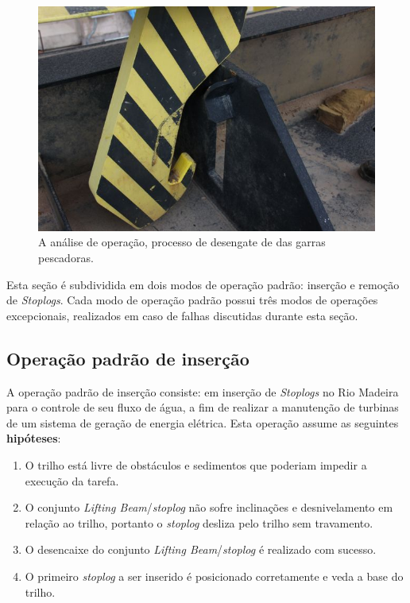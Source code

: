 \begin{figure}[h!]
    \centering \includegraphics[width=0.6\columnwidth]{figs/jirau/jirau_22}
    \caption{A análise de operação, processo de desengate de das garras pescadoras.}
    \label{fig:jirau22}
\end{figure}



\clearpage

Esta seção é subdividida em dois modos de operação padrão: inserção e remoção de
\emph{Stoplogs}. Cada modo de operação padrão possui três modos de operações
excepcionais, realizados em caso de falhas discutidas durante esta seção.



\subsection{Operação padrão de inserção}
A operação padrão de inserção consiste: em inserção de \emph{Stoplogs} no Rio
Madeira para o controle de seu fluxo de água, a fim de realizar a manutenção de
turbinas de um sistema de geração de energia elétrica. Esta operação assume as
seguintes \textbf{hipóteses}:
\begin{enumerate}
\item O trilho está livre de obstáculos e sedimentos que poderiam impedir a execução da tarefa.
\label{hip:ins:1}
\item O conjunto \emph{ Lifting Beam}/\emph{stoplog } não sofre inclinações e desnivelamento em relação ao trilho, portanto o \emph{stoplog} desliza pelo trilho sem travamento.
\item O desencaixe do conjunto \emph{Lifting Beam}/\emph{stoplog} é realizado com sucesso.
\item O primeiro \emph{stoplog} a ser inserido é posicionado corretamente e veda a base do trilho.
\label{hip:ins:4}
\end{enumerate}

